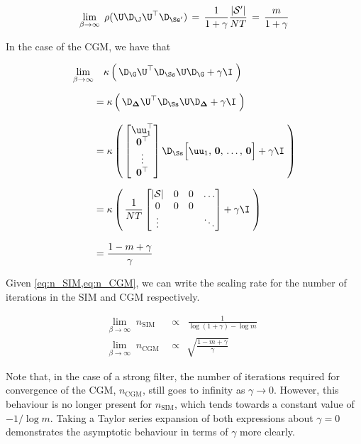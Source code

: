 \begin{equation}
    \label{eq:beta_lim_inf}
    \lim_{\beta \rightarrow \infty} \; \rho(\U \D_\J \U^\top \D_{\Ss'}) \, = \, \frac{1}{1 + \gamma} \frac{|\mathcal{S}'|}{NT} \, = \, \frac{m}{1 + \gamma}
\end{equation}

In the case of the CGM, we have that

\begin{align}
    \lim_{\beta \rightarrow \infty} & \quad \kappa \left(  \, \D_\G \U^\top \D_{\Ss} \U \D_\G + \gamma \I \; \right)  \notag \\[0.2cm]
    &= \kappa  \left(  \, \D_{\mathbf{\Delta}} \U^\top \D_{\Ss} \U \D_{\mathbf{\Delta}}  + \gamma \I \; \right) \notag \\[0.3cm]
    &= \kappa  \left(  \, 
    \begin{bmatrix} 
        \uu_1^\top \\ 
        \mathbf{0}^\top \\
        \vdots \\ 
        \mathbf{0}^\top 
    \end{bmatrix} \D_{\Ss}  \Big[ \uu_1, \, \mathbf{0}, \, \dots, \,\mathbf{0} \Big]
    + \gamma \I \; \right) \notag \\[0.2cm]
    &= \kappa  \left(  \, \frac{1}{NT}  \begin{bmatrix}
        |\mathcal{S}| & 0 & 0 & \dots \\
        0 & 0 & 0 &  \\
        \vdots & & & \ddots
    \end{bmatrix}   + \gamma \I \; \right) \notag \\[0.3cm]
    &= \frac{1 - m + \gamma}{\gamma}
\end{align}

Given \cref{eq:n_SIM,eq:n_CGM}, we can write the scaling rate for the number of iterations in the SIM and CGM respectively. 

\begin{align}
    \label{eq:n_SIM_SFL}
    \lim_{\beta \rightarrow \infty} \;  n_{\text{SIM}} \, & \propto \;\;  \frac{1}{\log(1 + \gamma) - \log m} \;\; \\[0.5cm]
    \lim_{\beta \rightarrow \infty} \;  n_{\text{CGM}} \, & \propto \;\, \sqrt{\frac{1 - m + \gamma}{\gamma}}
    \label{eq:n_CGM_SFL}
\end{align}
 

Note that, in the case of a strong filter, the number of iterations required for convergence of the CGM, $n_\text{CGM}$, still goes to infinity as $\gamma \rightarrow 0$. However, this behaviour is no longer present for $n_\text{SIM}$, which tends towards a constant value of $-1/\log m$. Taking a Taylor series expansion of both expressions about $\gamma=0$ demonstrates the asymptotic behaviour in terms of $\gamma$ more clearly. 


